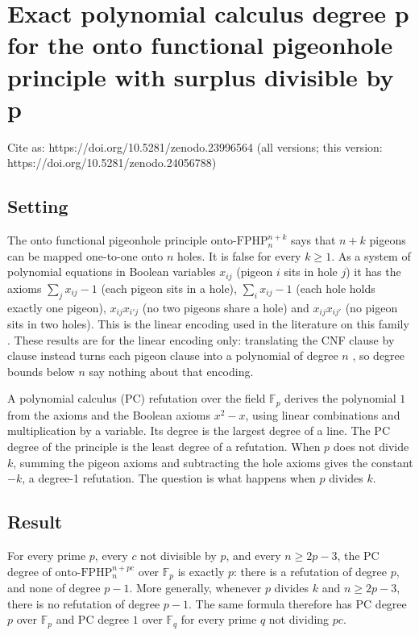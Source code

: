 \documentclass{article}
\begin{document}
\section{Exact polynomial calculus degree p for the onto functional pigeonhole principle with surplus divisible by p}
\label{sec:exact-pc-degree-onto-fphp-first-level}

Cite as: https://doi.org/10.5281/zenodo.23996564 (all versions; this version: https://doi.org/10.5281/zenodo.24056788)

\subsection*{Setting}

The onto functional pigeonhole principle $\mathrm{onto\text{-}FPHP}^{n+k}_n$ says that $n+k$
pigeons can be mapped one-to-one onto $n$ holes. It is false for every $k\ge1$. As a system of
polynomial equations in Boolean variables $x_{ij}$ (pigeon $i$ sits in hole $j$) it has the
axioms $\sum_j x_{ij}-1$ (each pigeon sits in a hole), $\sum_i x_{ij}-1$ (each hole holds exactly
one pigeon), $x_{ij}x_{i'j}$ (no two pigeons share a hole) and $x_{ij}x_{ij'}$ (no pigeon sits in
two holes). This is the linear encoding used in the literature on this family
\cite{beame1998counting,razborov2001php}. These results are for the linear encoding only: translating the CNF clause by clause instead turns each pigeon clause into a polynomial of degree $n$ \cite{razborov2001php}, so degree bounds below $n$ say nothing about that encoding.

A polynomial calculus (PC) refutation over the field $\mathbb F_p$ derives the polynomial $1$
from the axioms and the Boolean axioms $x^2-x$, using linear combinations and multiplication by a
variable. Its degree is the largest degree of a line. The PC degree of the principle is the least
degree of a refutation. When $p$ does not divide $k$, summing the pigeon axioms and subtracting
the hole axioms gives the constant $-k$, a degree-1 refutation. The question is what happens when
$p$ divides $k$.

\subsection*{Result}

For every prime $p$, every $c$ not divisible by $p$, and every $n\ge 2p-3$, the PC degree of
$\mathrm{onto\text{-}FPHP}^{n+pc}_n$ over $\mathbb F_p$ is exactly $p$: there is a refutation of
degree $p$, and none of degree $p-1$. More generally, whenever $p$ divides $k$ and $n\ge2p-3$,
there is no refutation of degree $p-1$. The same formula therefore has PC degree $p$ over
$\mathbb F_p$ and PC degree $1$ over $\mathbb F_q$ for every prime $q$ not dividing $pc$.
\end{document}
